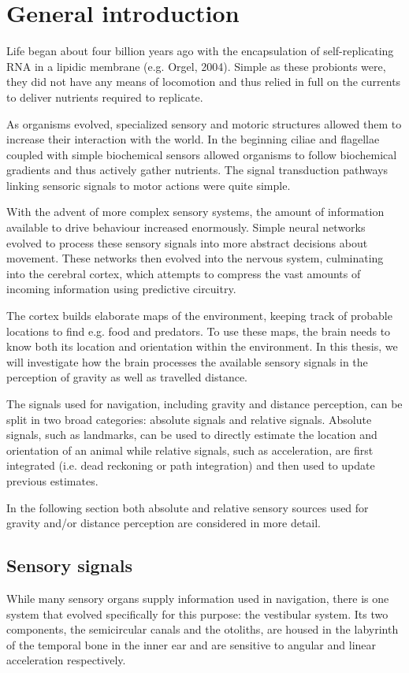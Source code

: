 \chapter{General introduction}
\newpage

Life began about four billion years ago with the encapsulation of self-replicating RNA in a lipidic membrane (e.g. Orgel, 2004). Simple as these probionts were, they did not have any means of locomotion and thus relied in full on the currents to deliver nutrients required to replicate. 

As organisms evolved, specialized sensory and motoric structures allowed them to increase their interaction with the world. In the beginning ciliae and flagellae coupled with simple biochemical sensors allowed organisms to follow biochemical gradients and thus actively gather nutrients. The signal transduction pathways linking sensoric signals to motor actions were quite simple.

With the advent of more complex sensory systems, the amount of information available to drive behaviour increased enormously. Simple neural networks evolved to process these sensory signals into more abstract decisions about movement. These networks then evolved into the nervous system, culminating into the cerebral cortex, which attempts to compress the vast amounts of incoming information using predictive circuitry.

The cortex builds elaborate maps of the environment, keeping track of probable locations to find e.g. food and predators. To use these maps, the brain needs to know both its location and orientation within the environment. In this thesis, we will investigate how the brain processes the available sensory signals in the perception of gravity as well as travelled distance.

The signals used for navigation, including gravity and distance perception, can be split in two broad categories: absolute signals and relative signals. Absolute signals, such as landmarks, can be used to directly estimate the location and orientation of an animal while relative signals, such as acceleration, are first integrated (i.e. dead reckoning or path integration) and then used to update previous estimates.

In the following section both absolute and relative sensory sources used for gravity and/or distance perception are considered in more detail.

\section{Sensory signals}
While many sensory organs supply information used in navigation, there is one system that evolved specifically for this purpose: the vestibular system. Its two components, the semicircular canals and the otoliths, are housed in the labyrinth of the temporal bone in the inner ear and are sensitive to angular and linear acceleration respectively.

